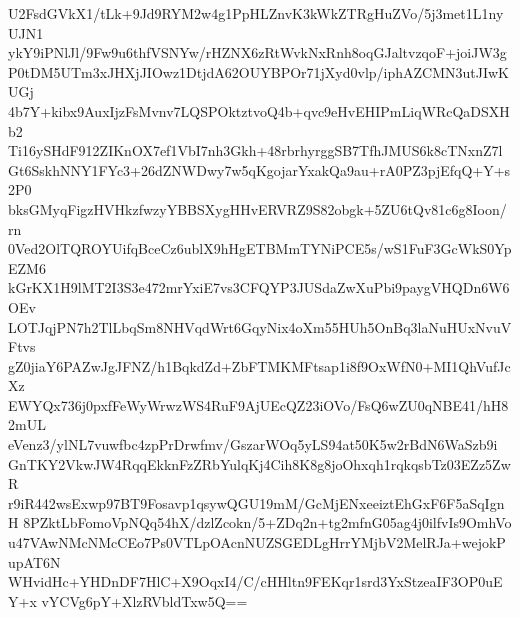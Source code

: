 U2FsdGVkX1/tLk+9Jd9RYM2w4g1PpHLZnvK3kWkZTRgHuZVo/5j3met1L1nyUJN1
ykY9iPNlJl/9Fw9u6thfVSNYw/rHZNX6zRtWvkNxRnh8oqGJaltvzqoF+joiJW3g
P0tDM5UTm3xJHXjJIOwz1DtjdA62OUYBPOr71jXyd0vlp/iphAZCMN3utJIwKUGj
4b7Y+kibx9AuxIjzFsMvnv7LQSPOktztvoQ4b+qvc9eHvEHIPmLiqWRcQaDSXHb2
Ti16ySHdF912ZIKnOX7ef1VbI7nh3Gkh+48rbrhyrggSB7TfhJMUS6k8cTNxnZ7l
Gt6SskhNNY1FYc3+26dZNWDwy7w5qKgojarYxakQa9au+rA0PZ3pjEfqQ+Y+s2P0
bksGMyqFigzHVHkzfwzyYBBSXygHHvERVRZ9S82obgk+5ZU6tQv81c6g8Ioon/rn
0Ved2OlTQROYUifqBceCz6ublX9hHgETBMmTYNiPCE5s/wS1FuF3GcWkS0YpEZM6
kGrKX1H9lMT2I3S3e472mrYxiE7vs3CFQYP3JUSdaZwXuPbi9paygVHQDn6W6OEv
LOTJqjPN7h2TlLbqSm8NHVqdWrt6GqyNix4oXm55HUh5OnBq3laNuHUxNvuVFtvs
gZ0jiaY6PAZwJgJFNZ/h1BqkdZd+ZbFTMKMFtsap1i8f9OxWfN0+MI1QhVufJcXz
EWYQx736j0pxfFeWyWrwzWS4RuF9AjUEcQZ23iOVo/FsQ6wZU0qNBE41/hH82mUL
eVenz3/ylNL7vuwfbc4zpPrDrwfmv/GszarWOq5yLS94at50K5w2rBdN6WaSzb9i
GnTKY2VkwJW4RqqEkknFzZRbYulqKj4Cih8K8g8joOhxqh1rqkqsbTz03EZz5ZwR
r9iR442wsExwp97BT9Fosavp1qsywQGU19mM/GcMjENxeeiztEhGxF6F5aSqIgnH
8PZktLbFomoVpNQq54hX/dzlZcokn/5+ZDq2n+tg2mfnG05ag4j0ilfvIs9OmhVo
u47VAwNMcNMcCEo7Ps0VTLpOAcnNUZSGEDLgHrrYMjbV2MelRJa+wejokPupAT6N
WHvidHc+YHDnDF7HlC+X9OqxI4/C/cHHltn9FEKqr1srd3YxStzeaIF3OP0uEY+x
vYCVg6pY+XlzRVbldTxw5Q==
